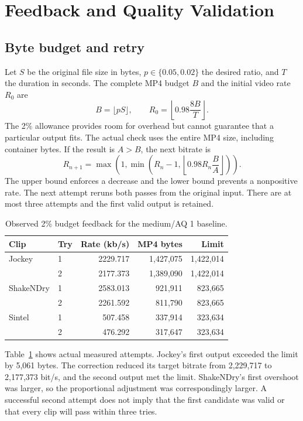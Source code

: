\documentclass[conference]{IEEEtran}
\begin{document}
\section{Feedback and Quality Validation}
\subsection{Byte budget and retry}
Let $S$ be the original file size in bytes, $p\in\{0.05,0.02\}$ the desired ratio, and $T$ the duration in seconds. The complete MP4 budget $B$ and the initial video rate $R_0$ are
\begin{equation}
B=\lfloor pS\rfloor,\qquad R_0=\left\lfloor0.98\frac{8B}{T}\right\rfloor.
\end{equation}
The 2\% allowance provides room for overhead but cannot guarantee that a particular output fits. The actual check uses the entire MP4 size, including container bytes. If the result is $A>B$, the next bitrate is
\begin{equation}
R_{n+1}=\max\!\left(1,\min\!\left(R_n-1,\left\lfloor0.98R_n\frac{B}{A}\right\rfloor\right)\right).
\end{equation}
The upper bound enforces a decrease and the lower bound prevents a nonpositive rate. The next attempt reruns both passes from the original input. There are at most three attempts and the first valid output is retained.
\begin{table}[H]\centering\caption{Observed 2\% budget feedback for the medium/AQ 1 baseline.}\label{tab:feedback}
\begin{tabular}{llrrr}\toprule
Clip & Try & Rate (kb/s) & MP4 bytes & Limit\\\midrule
Jockey & 1 & 2229.717 & 1,427,075 & 1,422,014\\
 & 2 & 2177.373 & 1,389,090 & 1,422,014\\
ShakeNDry & 1 & 2583.013 & 921,911 & 823,665\\
 & 2 & 2261.592 & 811,790 & 823,665\\
Sintel & 1 & 507.458 & 337,914 & 323,634\\
 & 2 & 476.292 & 317,647 & 323,634\\\bottomrule
\end{tabular}\end{table}
Table~\ref{tab:feedback} shows actual measured attempts. Jockey's first output exceeded the limit by 5,061 bytes. The correction reduced its target bitrate from 2,229,717 to 2,177,373 bit/s, and the second output met the limit. ShakeNDry's first overshoot was larger, so the proportional adjustment was correspondingly larger. A successful second attempt does not imply that the first candidate was valid or that every clip will pass within three tries.
\end{document}
